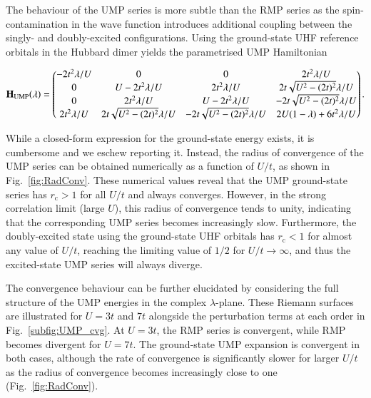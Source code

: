 \documentclass[aps,prb,reprint,noshowkeys,linenumbers,superscriptaddress]{revtex4-1}
\newcommand{\bH}{\mathbf{H}}
\newcommand{\rc}{r_{\text{c}}}
\begin{document}
The behaviour of the UMP series is more subtle than the RMP series as the spin-contamination in the wave function
introduces additional coupling between the singly- and doubly-excited configurations.
Using the ground-state UHF reference orbitals in the Hubbard dimer yields the parametrised UMP Hamiltonian
\begin{widetext}
\begin{equation}
\label{eq:H_UMP}
\bH_\text{UMP}\qty(\lambda) = 
	\begin{pmatrix}
		-2t^2 \lambda/U	&	0									&	0									&	2t^2 \lambda/U		\\
		0				&	U - 2t^2 \lambda/U 					&	2t^2\lambda/U						&	2t \sqrt{U^2 - (2t)^2} \lambda/U	\\
		0				&	2t^2\lambda/U						&	U - 2t^2 \lambda/U 					&	-2t \sqrt{U^2 - (2t)^2} \lambda/U	\\
		2t^2 \lambda/U	&	2t \sqrt{U^2 - (2t)^2} \lambda/U 	&	-2t \sqrt{U^2 - (2t)^2} \lambda/U	&	2U(1-\lambda) + 6t^2\lambda/U		\\
	\end{pmatrix}.
\end{equation}
\end{widetext}
While a closed-form expression for the ground-state energy exists, it is cumbersome and we eschew reporting it.
Instead, the radius of convergence of the UMP series can be obtained numerically as a function of $U/t$, as shown
in Fig.~\ref{fig:RadConv}.
These numerical values reveal that the UMP ground-state series has $\rc > 1$ for all $U/t$ and always converges.
However, in the strong correlation limit (large $U$), this radius of convergence tends to unity, indicating that
the corresponding UMP series becomes increasingly slow.
Furthermore, the doubly-excited state using the ground-state UHF orbitals has $\rc < 1$ for almost any value 
of $U/t$, reaching the limiting value of $1/2$ for $U/t \rightarrow \infty$, and thus the 
excited-state UMP series will always diverge.
 
The convergence behaviour can be further elucidated by considering the full structure of the UMP energies 
in the complex $\lambda$-plane.
These Riemann surfaces are illustrated for $U = 3t$ and $7t$ alongside the perturbation terms at each order
in Fig.~\ref{subfig:UMP_cvg}.
At $U = 3t$, the RMP series is convergent, while RMP becomes divergent for $U=7t$.
The ground-state UMP expansion is convergent in both cases, although the rate of convergence is significantly slower 
for larger $U/t$ as the radius of convergence becomes increasingly close to one (Fig.~\ref{fig:RadConv}).
\end{document}
